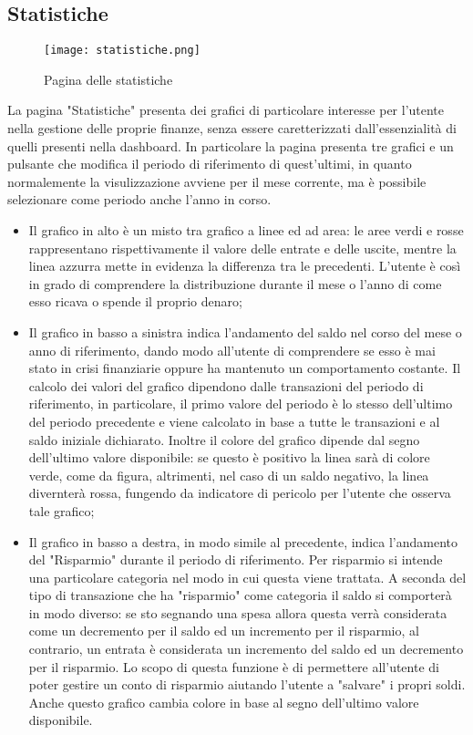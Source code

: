 \documentclass[binding=0.6cm, oneside, noexaminfo, italian]{sapthesis}
\begin{document}
\subsection{Statistiche}
\begin{figure}[h]
    \centering
    \texttt{[image: statistiche.png]}
    \caption{Pagina delle statistiche}
    \label{fig:statistiche}
\end{figure}
La pagina "Statistiche" presenta dei grafici di particolare interesse per l'utente nella gestione delle proprie finanze, senza essere caretterizzati dall'essenzialità di quelli presenti nella dashboard. In particolare la pagina presenta tre grafici e un pulsante che modifica il periodo di riferimento di quest'ultimi, in quanto normalemente la visulizzazione avviene per il mese corrente, ma è possibile selezionare come periodo anche l'anno in corso.
\begin{itemize}
    \item Il grafico in alto è un misto tra grafico a linee ed ad area: le aree verdi e rosse rappresentano rispettivamente il valore delle entrate e delle uscite, mentre la linea azzurra mette in evidenza la differenza tra le precedenti. L'utente è così in grado di comprendere la distribuzione durante il mese o l'anno di come esso ricava o spende il proprio denaro;
    \item Il grafico in basso a sinistra indica l'andamento del saldo nel corso del mese o anno di riferimento, dando modo all'utente di comprendere se esso è mai stato in crisi finanziarie oppure ha mantenuto un comportamento costante. Il calcolo dei valori del grafico dipendono dalle transazioni del periodo di riferimento, in particolare, il primo valore del periodo è lo stesso dell'ultimo del periodo precedente e viene calcolato in base a tutte le transazioni e al saldo iniziale dichiarato. Inoltre il colore del grafico dipende dal segno dell'ultimo valore disponibile: se questo è positivo la linea sarà di colore verde, come da figura, altrimenti, nel caso di un saldo negativo, la linea divernterà rossa, fungendo da indicatore di pericolo per l'utente che osserva tale grafico;
    \item Il grafico in basso a destra, in modo simile al precedente, indica l'andamento del "Risparmio" durante il periodo di riferimento. Per risparmio si intende una particolare categoria nel modo in cui questa viene trattata. A seconda del tipo di transazione che ha "risparmio" come categoria il saldo si comporterà in modo diverso: se sto segnando una spesa allora questa verrà considerata come un decremento per il saldo ed un incremento per il risparmio, al contrario, un entrata è considerata un incremento del saldo ed un decremento per il risparmio. Lo scopo di questa funzione è di permettere all'utente di poter gestire un conto di risparmio aiutando l'utente a "salvare" i propri soldi. Anche questo grafico cambia colore in base al segno dell'ultimo valore disponibile.
\end{itemize}
\end{document}
